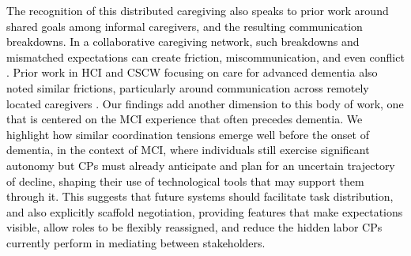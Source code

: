 \documentclass[acmsmall]{acmart}
\begin{document}
\textcolor{black}{The recognition of this distributed caregiving also speaks to prior work around shared goals among informal caregivers, and the resulting communication breakdowns. In a collaborative caregiving network, such breakdowns and mismatched expectations can create friction, miscommunication, and even conflict \cite{consolvo2004technology, currin2019give, tang2018awareness}. Prior work in HCI and CSCW focusing on care for advanced dementia also noted similar frictions, particularly around communication across remotely located caregivers \cite{johnson2020roles, devries2019impact}. Our findings add another dimension to this body of work, one that is centered on the MCI experience that often precedes dementia. We highlight how similar coordination tensions emerge well before the onset of dementia, in the context of MCI, where individuals still exercise significant autonomy but CPs must already anticipate and plan for an uncertain trajectory of decline, shaping their use of technological tools that may support them through it. This suggests that future systems should facilitate task distribution, and also explicitly scaffold negotiation, providing features that make expectations visible, allow roles to be flexibly reassigned, and reduce the hidden labor CPs currently perform in mediating between stakeholders.}
\end{document}
